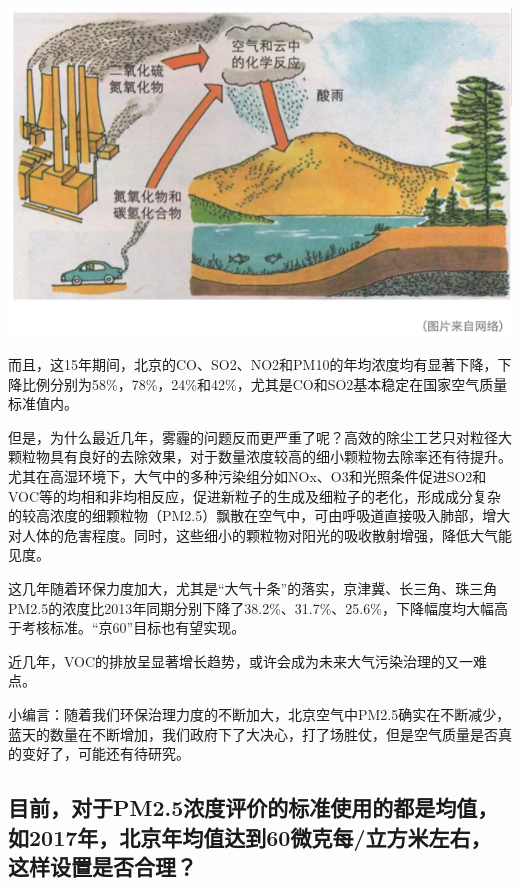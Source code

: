 \documentclass[]{book}
\begin{document}
\includegraphics[width=8.33in]{images/air2}

而且，这15年期间，北京的CO、SO2、NO2和PM10的年均浓度均有显著下降，下降比例分别为58\%，78\%，24\%和42\%，尤其是CO和SO2基本稳定在国家空气质量标准值内。

但是，为什么最近几年，雾霾的问题反而更严重了呢？高效的除尘工艺只对粒径大颗粒物具有良好的去除效果，对于数量浓度较高的细小颗粒物去除率还有待提升。尤其在高湿环境下，大气中的多种污染组分如NOx、O3和光照条件促进SO2和VOC等的均相和非均相反应，促进新粒子的生成及细粒子的老化，形成成分复杂的较高浓度的细颗粒物（PM2.5）飘散在空气中，可由呼吸道直接吸入肺部，增大对人体的危害程度。同时，这些细小的颗粒物对阳光的吸收散射增强，降低大气能见度。

这几年随着环保力度加大，尤其是``大气十条''的落实，京津冀、长三角、珠三角PM2.5的浓度比2013年同期分别下降了38.2\%、31.7\%、25.6\%，下降幅度均大幅高于考核标准。``京60''目标也有望实现。

近几年，VOC的排放呈显著增长趋势，或许会成为未来大气污染治理的又一难点。

小编言：随着我们环保治理力度的不断加大，北京空气中PM2.5确实在不断减少，蓝天的数量在不断增加，我们政府下了大决心，打了场胜仗，但是空气质量是否真的变好了，可能还有待研究。

\hypertarget{ux76eeux524dux5bf9ux4e8epm2.5ux6d53ux5ea6ux8bc4ux4ef7ux7684ux6807ux51c6ux4f7fux7528ux7684ux90fdux662fux5747ux503cux59822017ux5e74ux5317ux4eacux5e74ux5747ux503cux8fbeux523060ux5faeux514bux6bcfux7acbux65b9ux7c73ux5de6ux53f3ux8fd9ux6837ux8bbeux7f6eux662fux5426ux5408ux7406}{%
\subsection{目前，对于PM2.5浓度评价的标准使用的都是均值，如2017年，北京年均值达到60微克每/立方米左右，这样设置是否合理？}\label{ux76eeux524dux5bf9ux4e8epm2.5ux6d53ux5ea6ux8bc4ux4ef7ux7684ux6807ux51c6ux4f7fux7528ux7684ux90fdux662fux5747ux503cux59822017ux5e74ux5317ux4eacux5e74ux5747ux503cux8fbeux523060ux5faeux514bux6bcfux7acbux65b9ux7c73ux5de6ux53f3ux8fd9ux6837ux8bbeux7f6eux662fux5426ux5408ux7406}}
\end{document}
